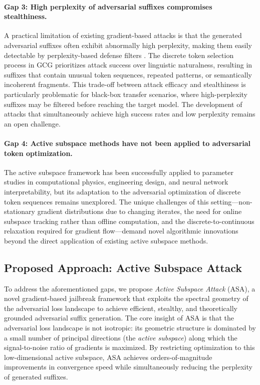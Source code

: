 \documentclass[preprint,12pt]{elsarticle}
\begin{document}
\paragraph{Gap 3: High perplexity of adversarial suffixes compromises stealthiness.} A practical limitation of existing gradient-based attacks is that the generated adversarial suffixes often exhibit abnormally high perplexity, making them easily detectable by perplexity-based defense filters \cite{zhu2023autodan, robey2023smoothllm}. The discrete token selection process in GCG prioritizes attack success over linguistic naturalness, resulting in suffixes that contain unusual token sequences, repeated patterns, or semantically incoherent fragments. This trade-off between attack efficacy and stealthiness is particularly problematic for black-box transfer scenarios, where high-perplexity suffixes may be filtered before reaching the target model. The development of attacks that simultaneously achieve high success rates and low perplexity remains an open challenge.

\paragraph{Gap 4: Active subspace methods have not been applied to adversarial token optimization.} The active subspace framework \cite{constantine2014active, constantine2015active} has been successfully applied to parameter studies in computational physics, engineering design, and neural network interpretability, but its adaptation to the adversarial optimization of discrete token sequences remains unexplored. The unique challenges of this setting---non-stationary gradient distributions due to changing iterates, the need for online subspace tracking rather than offline computation, and the discrete-to-continuous relaxation required for gradient flow---demand novel algorithmic innovations beyond the direct application of existing active subspace methods.

\subsection{Proposed Approach: Active Subspace Attack}
\label{sec:proposed_approach}

To address the aforementioned gaps, we propose \textit{Active Subspace Attack} (ASA), a novel gradient-based jailbreak framework that exploits the spectral geometry of the adversarial loss landscape to achieve efficient, stealthy, and theoretically grounded adversarial suffix generation. The core insight of ASA is that the adversarial loss landscape is not isotropic: its geometric structure is dominated by a small number of principal directions (the \textit{active subspace}) along which the signal-to-noise ratio of gradients is maximized. By restricting optimization to this low-dimensional active subspace, ASA achieves orders-of-magnitude improvements in convergence speed while simultaneously reducing the perplexity of generated suffixes.
\end{document}
